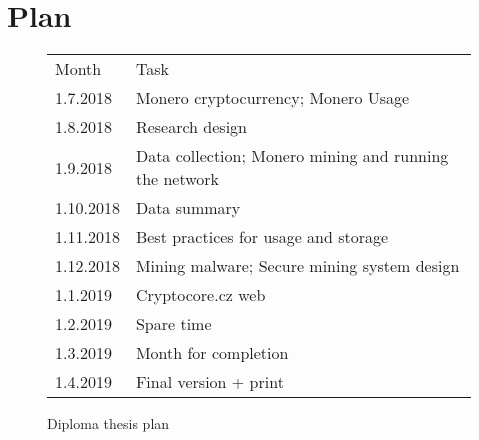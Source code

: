 \documentclass[
  printed, %
  table,   %
  nolof,     %
  nolot,     %
           oneside, color
]{fithesis3}
\begin{document}
\chapter{Plan}

\begin{figure}[H]
\center
\begin{tabular}{ll}
Month     & Task                                              \\
1.7.2018  & Monero cryptocurrency; Monero Usage              \\
1.8.2018  & Research design  \\
1.9.2018  & Data collection; Monero mining and running the network \\
1.10.2018 & Data summary                                   \\
1.11.2018 & Best practices for usage and storage                \\
1.12.2018 & Mining malware; Secure mining system design     \\
1.1.2019  & Cryptocore.cz web            \\
1.2.2019  & Spare time                                           \\
1.3.2019  & Month for completion                                 \\
1.4.2019  & Final version + print                            
\end{tabular}
\caption{Diploma thesis plan}
\label{ssme-thesis-plan}
\end{figure}



\printbibliography[heading=bibintoc]

\appendix %
\end{document}
